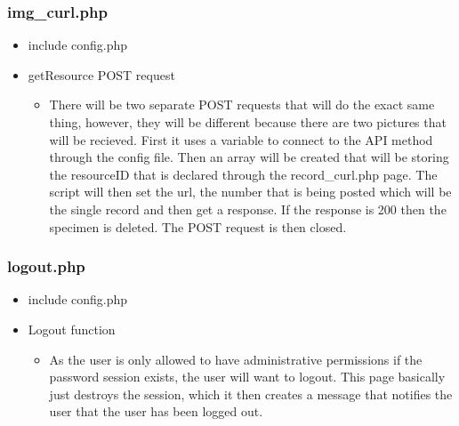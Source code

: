     \subsubsection{img\_curl.php}
        \begin{itemize}
            \item include config.php
            \item getResource POST request
            \begin{itemize}
                \item There will be two separate POST requests that will do the exact same thing, however, they will be different because there are two pictures that will be recieved. First it uses a variable to connect to the API method through the config file. Then an array will be created that will be storing the resourceID that is declared through the record\_curl.php page. The script will then set the url, the number that is being posted which will be the single record and then get a response. If the response is 200 then the specimen is deleted. The POST request is then closed.
            \end{itemize}
        \end{itemize}
        
    \subsubsection{logout.php}
        \begin{itemize}
            \item include config.php
            \item Logout function
            \begin{itemize}
                \item As the user is only allowed to have administrative permissions if the password session exists, the user will want to logout. This page basically just destroys the session, which it then creates a message that notifies the user that the user has been logged out.
            \end{itemize}
        \end{itemize}

